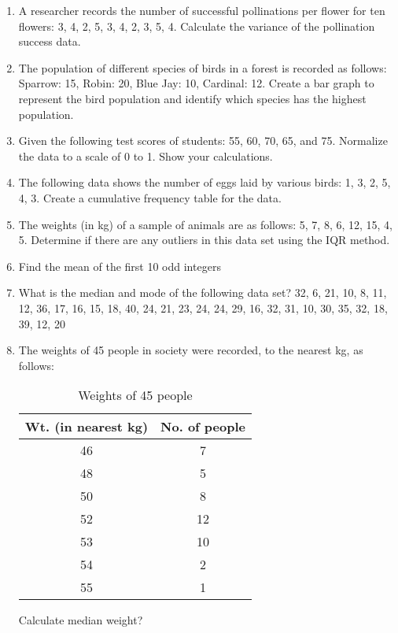 \documentclass[11pt]{article}
\begin{document}
\begin{enumerate}
    \item A researcher records the number of successful pollinations per flower for ten flowers: 3, 4, 2, 5, 3, 4, 2, 3, 5, 4. Calculate the variance of the pollination success data.

    \item The population of different species of birds in a forest is recorded as follows: Sparrow: 15, Robin: 20, Blue Jay: 10, Cardinal: 12. Create a bar graph to represent the bird population and identify which species has the highest population.


    \item Given the following test scores of students: 55, 60, 70, 65, and 75. Normalize the data to a scale of 0 to 1. Show your calculations.

    \item The following data shows the number of eggs laid by various birds: 1, 3, 2, 5, 4, 3. Create a cumulative frequency table for the data.

    \item The weights (in kg) of a sample of animals are as follows: 5, 7, 8, 6, 12, 15, 4, 5. Determine if there are any outliers in this data set using the IQR method.
    \item Find the mean of the first 10 odd integers
    \item What is the median and mode of the following data set?
32, 6, 21, 10, 8, 11, 12, 36, 17, 16, 15, 18, 40, 24, 21, 23, 24, 24, 29, 16, 32, 31, 10, 30, 35, 32, 18, 39, 12, 20


\item The weights of 45 people in society were recorded, to the nearest kg, as follows:

\begin{table}[h]
    \centering
    \begin{tabular}{cc}
        \toprule
        \textbf{Wt. (in nearest kg)} & \textbf{No. of people} \\
        \midrule
        46 & 7 \\
        48 & 5 \\
        50 & 8 \\
        52 & 12 \\
        53 & 10 \\
        54 & 2 \\
        55 & 1 \\
        \bottomrule
    \end{tabular}
    \caption{Weights of 45 people}
    \label{tab:weights}
\end{table}
Calculate median weight?



\end{enumerate}
\end{document}
